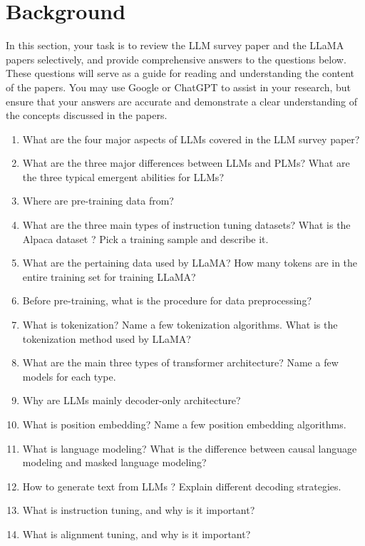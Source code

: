\section{Background}
\label{sec:background}

In this section, your task is to review the LLM survey paper \cite{zhao2023survey} and the LLaMA papers \cite{touvron2023llama, touvron2023llama2} selectively, and provide comprehensive answers to the questions below. These questions will serve as a guide for reading and understanding the content of the papers. You may use Google or ChatGPT to assist in your research, but ensure that your answers are accurate and demonstrate a clear understanding of the concepts discussed in the papers.

\begin{enumerate}
\item What are the four major aspects of LLMs covered in the LLM survey paper?
\item What are the three major differences between LLMs and PLMs? What are the three typical emergent abilities for LLMs?
\item Where are pre-training data from? 
\item What are the three main types of instruction tuning datasets? What is the Alpaca dataset \cite{alpaca}? Pick a training sample and describe it.
\item What are the pertaining data used by LLaMA? How many tokens are in the entire training set for training LLaMA?
\item Before pre-training, what is the procedure for data preprocessing?
\item What is tokenization? Name a few tokenization algorithms. What is the tokenization method used by LLaMA?
\item What are the main three types of transformer architecture? Name a few models for each type.
\item Why are LLMs mainly decoder-only architecture?
\item What is position embedding? Name a few position embedding algorithms.
\item What is language modeling? What is the difference between causal language modeling and masked language modeling?
\item How to generate text from LLMs \cite{generate}? Explain different decoding strategies.
\item What is instruction tuning, and why is it important?
\item What is alignment tuning, and why is it important?

\end{enumerate}
